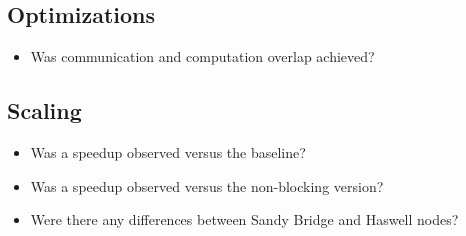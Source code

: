 \documentclass[9pt,pdftex]{beamer}
\begin{document}
\subsection{Optimizations}
\begin{frame}{\insertsubsection}
\begin{itemize}
\item Was communication and computation overlap achieved?
\end{itemize}
\end{frame}

\subsection{Scaling}
\begin{frame}{\insertsubsection}
\begin{itemize}
\item Was a speedup observed versus the baseline?
\item Was a speedup observed versus the non-blocking version?
\item Were there any differences between Sandy Bridge and Haswell nodes?
\end{itemize}
\end{frame}
\end{document}
